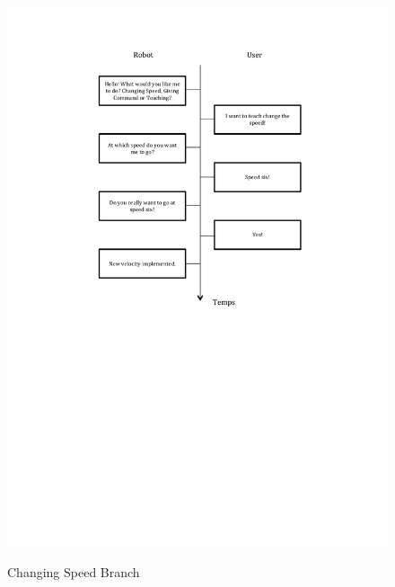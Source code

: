 \begin{figure}
\begin{center}
\includegraphics[width=16cm]{img/Schema_Dialogue_SpeedingBranch.pdf}\\
\caption{Changing Speed Branch}
\end{center}
\end{figure}